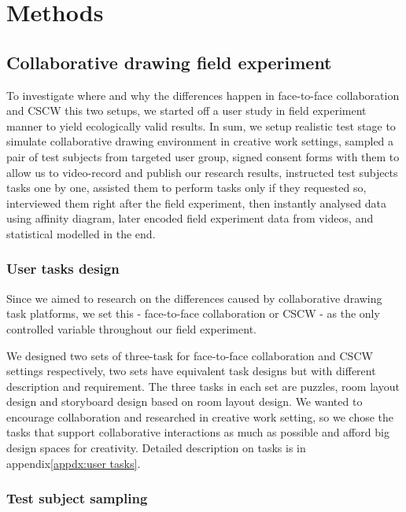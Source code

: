 \documentclass[12pt,twoside]{article}
\begin{document}
\section{Methods}
\label{sec:method}

\subsection{Collaborative drawing field experiment}
\label{sect:collaborative}
To investigate where and why the differences happen in face-to-face collaboration and CSCW this two setups, we started off a user study in field experiment manner to yield ecologically valid results. In sum, we setup realistic test stage to simulate collaborative drawing environment in creative work settings, sampled a pair of test subjects from targeted user group, signed consent forms with them to allow us to video-record and publish our research results, instructed test subjects tasks one by one, assisted them to perform tasks only if they requested so, interviewed them right after the field experiment, then instantly analysed data using affinity diagram, later encoded field experiment data from videos, and statistical modelled in the end.

\subsubsection{User tasks design}

Since we aimed to research on the differences caused by collaborative drawing task platforms, we set this - face-to-face collaboration or CSCW - as the only controlled variable throughout our field experiment. 

We designed two sets of three-task for face-to-face collaboration and CSCW settings respectively, two sets have equivalent task designs but with different description and requirement. The three tasks in each set are puzzles, room layout design and storyboard design based on room layout design. We wanted to encourage collaboration and researched in creative work setting, so we chose the tasks that support collaborative interactions as much as possible and afford big design spaces for creativity. Detailed description on tasks is in appendix\ref{appdx:user tasks}. 

\subsubsection{Test subject sampling}
\end{document}
